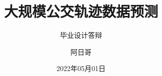 \documentclass[aspectratio=1610]{beamer}
\author{阿日哥}
\title{大规模公交轨迹数据预测}
\subtitle{毕业设计答辩}
\institute{武汉大学计算机学院}
\date{2022年05月01日}
\begin{document}
\kaishu






\end{document}
